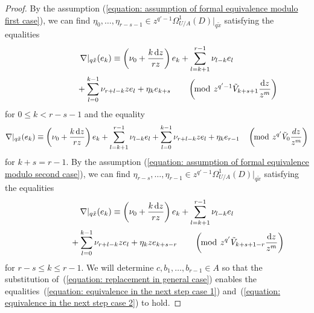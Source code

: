 \documentclass[pdftex]{sigma}
\numberwithin{equation}{section}
\begin{document}
\begin{proof}
By the assumption (\ref{equation: assumption of formal equivalence modulo first case}),
we can find
$\eta_0,\dots,\eta_{r-s-1}\in z^{q'-1}\Omega^1_{U/A}(D)|_{q\tilde{x}}$
satisfying the equalities
\begin{gather*}
 \nabla|_{q\tilde{x}} (e_k)
 \equiv
 \left( \nu_0+\frac{k\,{\rm d}z}{r z} \right) e_k
 +\sum_{l=k+1}^{r-1}\nu_{l-k} e_l\\
 \hphantom{\nabla|_{q\tilde{x}} (e_k) \equiv}{}
 +\sum_{l=0}^{k-1} \nu_{r+l-k} z e_l
 +\eta_k e_{k+s}
 \qquad
 \left(\! \bmod \ z^{q'-1}\tilde{V}_{k+s+1}\frac{{\rm d}z}{z^m} \right)
\end{gather*}
for $0\leq k<r-s-1$ and the equality
\begin{gather*}
 \nabla|_{q\tilde{x}} (e_k)
 \equiv
 \left( \nu_0+\frac{k\,{\rm d}z}{r z} \right) e_k
 +\sum_{l=k+1}^{r-1}\nu_{l-k} e_l
 +\sum_{l=0}^{k-1} \nu_{r+l-k} z e_l
 +\eta_k e_{r-1}
 \quad
 \left(\! \bmod \ z^{q'}\tilde{V}_0\frac{dz}{z^m} \right)
\end{gather*}
for $k+s=r-1$.
By the assumption (\ref{equation: assumption of formal equivalence modulo second case}),
we can find $\eta_{r-s},\dots,\eta_{r-1}\in z^{q'-1}\Omega^1_{U/A}(D)|_{q\tilde{x}}$
satisfying the equalities
\begin{gather*}
 \nabla|_{q\tilde{x}} (e_k)
 \equiv
 \left( \nu_0+\frac{k\,{\rm d}z}{r z} \right) e_k
 +\sum_{l=k+1}^{r-1}\nu_{l-k} e_l\\
 \hphantom{\nabla|_{q\tilde{x}} (e_k) \equiv}{}
 +\sum_{l=0}^{k-1} \nu_{r+l-k} z e_l
 +\eta_k z e_{k+s-r}
 \qquad
 \left(\! \bmod \ z^{q'}\tilde{V}_{k+s+1-r}\frac{{\rm d}z}{z^m} \right)
\end{gather*}
for $r-s\leq k \leq r-1$.
We will determine $c,b_1,\dots,b_{r-1}\in A$
so that the substitution of~(\ref{equation: replacement in general case})
enables the equalities~(\ref{equation: equivalence in the next step case 1})
and~(\ref{equation: equivalence in the next step case 2}) to hold.


\end{proof}
\end{document}
